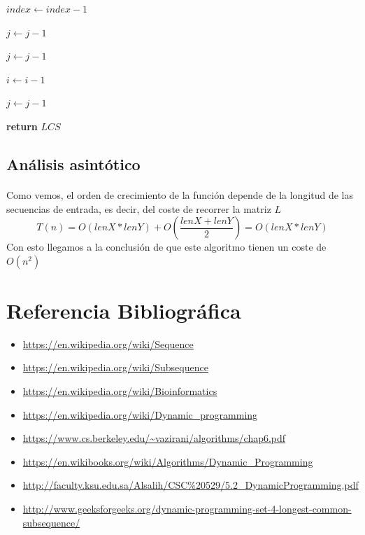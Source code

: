 \documentclass{article}
\begin{document}
\begin{algorithm}[H]
\begin{algorithmic}[1]
						\State $index\gets index - 1$
 				
						\State $j\gets j - 1$
 				
						\State $j\gets j - 1$

 				
						\State $i\gets i - 1$
				
					\Else
 				
						\State $j\gets j - 1$
				
					\EndIf
				
				\EndWhile
				
				\State

				\State \textbf{return} $LCS$

			\EndFunction
			
			\end{algorithmic}

		\end{algorithm}

	\subsection{Análisis asintótico}
		\paragraph{}
		Como vemos, el orden de crecimiento de la función depende de la longitud de las secuencias de entrada, es decir, del coste de recorrer la matriz $L$
		\[
		T(n) = O(lenX*lenY) + O(\frac{lenX+lenY}{2}) = O(lenX*lenY)
		\]
		Con esto llegamos a la conclusión de que este algoritmo tienen un coste de $O(n^2)$
		
	\section{Referencia Bibliográfica}

		\begin{itemize}
			\item \url{https://en.wikipedia.org/wiki/Sequence}
			\item \url{https://en.wikipedia.org/wiki/Subsequence}
			\item \url{https://en.wikipedia.org/wiki/Bioinformatics}
			\item \url{https://en.wikipedia.org/wiki/Dynamic_programming}
			\item \url{https://www.cs.berkeley.edu/~vazirani/algorithms/chap6.pdf}
			\item \url{https://en.wikibooks.org/wiki/Algorithms/Dynamic_Programming}
			\item \url{http://faculty.ksu.edu.sa/Alsalih/CSC%20529/5.2_DynamicProgramming.pdf}
			\item \url{http://www.geeksforgeeks.org/dynamic-programming-set-4-longest-common-subsequence/}

		\end{itemize}
\end{document}
